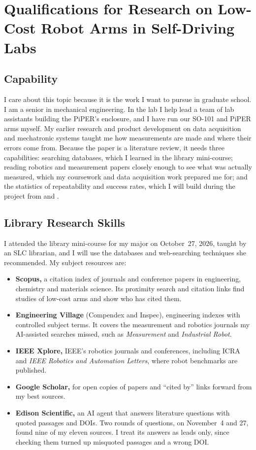 \section{Qualifications for Research on Low-Cost Robot Arms in Self-Driving Labs}

\subsection{Capability}

I care about this topic because it is the work I want to pursue in graduate school. I am a
senior in mechanical engineering. In the lab I help lead a team of lab assistants building the
PiPER's enclosure, and I have run our SO-101 and PiPER arms myself. My earlier research and
product development on data acquisition and mechatronic systems taught me how measurements are
made and where their errors come from. Because the paper is a literature review, it needs three
capabilities: searching databases, which I learned in the library mini-course; reading robotics
and measurement papers closely enough to see what was actually measured, which my coursework
and data acquisition work prepared me for; and the statistics of repeatability and success
rates, which I will build during the project from \cite{chajon2026} and \cite{vincent2024}.

\subsection{Library Research Skills}\label{sec:library}

I attended the library mini-course for my major on October~27, 2026, taught by an SLC
librarian, and I will use the databases and web-searching techniques she recommended.
My subject resources are:
\begin{itemize}
  \item \textbf{Scopus,} a citation index of journals and conference papers in engineering,
    chemistry and materials science. Its proximity search and citation links find studies of
    low-cost arms and show who has cited them.
  \item \textbf{Engineering Village} (Compendex and Inspec), engineering indexes with controlled
    subject terms. It covers the measurement and robotics journals my AI-assisted searches
    missed, such as \emph{Measurement} and \emph{Industrial Robot}.
  \item \textbf{IEEE Xplore,} IEEE's robotics journals and conferences, including ICRA and
    \emph{IEEE Robotics and Automation Letters}, where robot benchmarks are published.
  \item \textbf{Google Scholar,} for open copies of papers and ``cited by'' links forward from my
    best sources.
  \item \textbf{Edison Scientific,} an AI agent that answers literature questions with quoted
    passages and DOIs. Two rounds of questions, on November~4 and 27, found nine of my eleven
    sources. I treat its answers as leads only, since checking them turned up misquoted passages
    and a wrong DOI.
\end{itemize}

